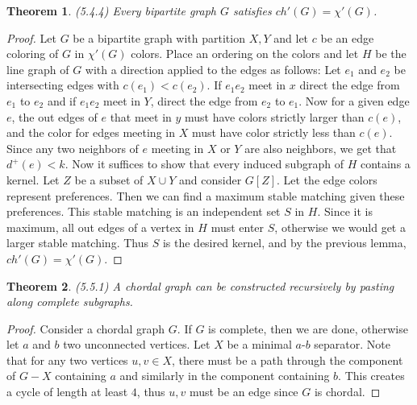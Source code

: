 \documentclass[12pt]{article}
\newtheorem{theorem}{Theorem}
\begin{document}
\begin{theorem} (5.4.4) Every bipartite graph $G$ satisfies
  $ch'(G) = \chi'(G)$.
\end{theorem}
\begin{proof} Let $G$ be a bipartite graph with partition $X,Y$ and
  let $c$ be an edge coloring of $G$ in $\chi'(G)$ colors. Place an
  ordering on the colors and let $H$ be the line graph of $G$ with a
  direction applied to the edges as follows: Let $e_1$ and $e_2$ be
  intersecting edges with $c(e_1) < c(e_2)$. If $e_1e_2$ meet in $x$
  direct the edge from $e_1$ to $e_2$ and if $e_1e_2$ meet in $Y$,
  direct the edge from $e_2$ to $e_1$. Now for a given edge $e$, the
  out edges of $e$ that meet in $y$ must have colors strictly larger
  than $c(e)$, and the color for edges meeting in $X$ must have color
  strictly less than $c(e)$. Since any two neighbors of $e$ meeting in
  $X$ or $Y$ are also neighbors, we get that $d^+(e) < k$. Now it
  suffices to show that every induced subgraph of $H$ contains a
  kernel. Let $Z$ be a subset of $X \cup Y$ and consider $G[Z]$. Let
  the edge colors represent preferences. Then we can find a maximum
  stable matching given these preferences. This stable matching is an
  independent set $S$ in $H$. Since it is maximum, all out edges of a
  vertex in $H$ must enter $S$, otherwise we would get a larger stable
  matching. Thus $S$ is the desired kernel, and by the previous lemma,
  $ch'(G) = \chi'(G)$.
\end{proof}

\begin{theorem} (5.5.1) A chordal graph can be constructed recursively
  by pasting along complete subgraphs.
\end{theorem}
\begin{proof} Consider a chordal graph $G$. If $G$ is complete, then
  we are done, otherwise let $a$ and $b$ two unconnected vertices. Let
  $X$ be a minimal $a$-$b$ separator. Note that for any two vertices
  $u, v \in X$, there must be a path through the component of $G - X$
  containing $a$ and similarly in the component containing $b$. This
  creates a cycle of length at least $4$, thus $u,v$ must be an edge
  since $G$ is chordal.
\end{proof}
\end{document}
